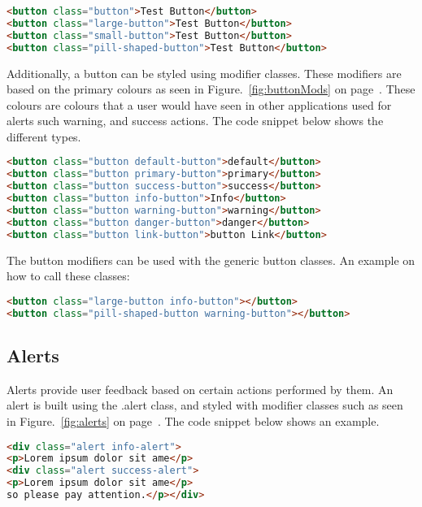 \begin{lstlisting}[language=HTML]
 <button class="button">Test Button</button>
<button class="large-button">Test Button</button>
<button class="small-button">Test Button</button>
<button class="pill-shaped-button">Test Button</button>
\end{lstlisting}

Additionally, a button can be styled using modifier classes. These modifiers are based on the primary colours as seen in Figure.~\ref{fig:buttonMods} on  page~\pageref{fig:buttonMods}. These colours are colours that a user would have seen in other applications used for alerts such warning, and success actions. The code snippet below shows the different types.

\begin{lstlisting}[language=HTML]
<button class="button default-button">default</button>
<button class="button primary-button">primary</button>
<button class="button success-button">success</button>
<button class="button info-button">Info</button>
<button class="button warning-button">warning</button>
<button class="button danger-button">danger</button>
<button class="button link-button">button Link</button>
\end{lstlisting}

The button modifiers can be used with the generic button classes. An example on how to call these classes: 

\begin{lstlisting}[language=HTML]
<button class="large-button info-button"></button>
<button class="pill-shaped-button warning-button"></button>
\end{lstlisting}

\newpage
\subsection*{Alerts}
Alerts provide user feedback based on certain actions performed by them. An alert is built using the .alert class, and styled with modifier classes such as seen in Figure.~\ref{fig:alerts} on  page~\pageref{fig:alerts}. The code snippet below shows an example.

\begin{lstlisting}[language=HTML]
<div class="alert info-alert">
<p>Lorem ipsum dolor sit ame</p>
<div class="alert success-alert">
<p>Lorem ipsum dolor sit ame</p>
so please pay attention.</p></div>
\end{lstlisting}

